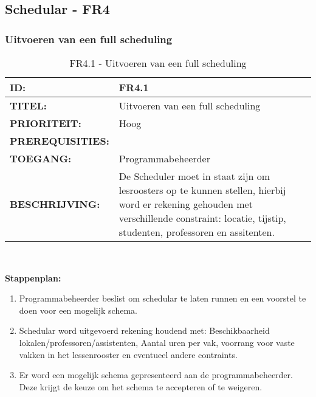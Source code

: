 \subsection{Schedular - FR4}

\subsubsection{Uitvoeren van een full scheduling}
\noindent\begin{table}[H]
            \begin{tabular}{l | p{10cm}}
                \textbf{ID:} & FR4.1 \\ \hline
                \textbf{TITEL:} & Uitvoeren van een full scheduling\\ \hline
                \textbf{PRIORITEIT:} &  Hoog \\ \hline
                \textbf{PREREQUISITIES:} & \\ \hline
                \textbf{TOEGANG:} & Programmabeheerder \\ \hline
                \textbf{BESCHRIJVING:} & De Scheduler moet in staat zijn om lesroosters op te kunnen stellen, hierbij word er rekening gehouden met verschillende constraint: locatie, tijstip, studenten, professoren en assitenten. \\
            \end{tabular}\\
            \caption{FR4.1 - Uitvoeren van een full scheduling}
            \label{tab:FR4.1 - Uitvoeren van een full scheduling}
        \end{table}
      
\textbf{Stappenplan:}
	\begin{enumerate}
	\item Programmabeheerder beslist om schedular te laten runnen en een voorstel te doen voor een mogelijk schema.
	\item Schedular word uitgevoerd rekening houdend met: Beschikbaarheid lokalen/professoren/assistenten, Aantal uren per vak, voorrang voor vaste vakken in het lessenrooster en eventueel andere contraints.
	\item Er word een mogelijk schema gepresenteerd aan de programmabeheerder. Deze krijgt de keuze om het schema te accepteren of te weigeren.
	\end{enumerate}
	
